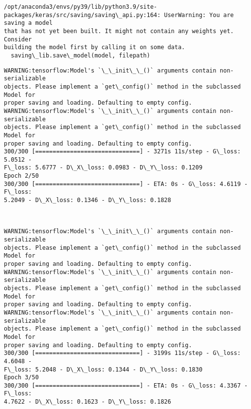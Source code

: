 \documentclass[11pt]{article}
\begin{document}
    \begin{Verbatim}[commandchars=\\\{\}]
/opt/anaconda3/envs/py39/lib/python3.9/site-
packages/keras/src/saving/saving\_api.py:164: UserWarning: You are saving a model
that has not yet been built. It might not contain any weights yet. Consider
building the model first by calling it on some data.
  saving\_lib.save\_model(model, filepath)
    \end{Verbatim}

    \begin{Verbatim}[commandchars=\\\{\}]
WARNING:tensorflow:Model's `\_\_init\_\_()` arguments contain non-serializable
objects. Please implement a `get\_config()` method in the subclassed Model for
proper saving and loading. Defaulting to empty config.
WARNING:tensorflow:Model's `\_\_init\_\_()` arguments contain non-serializable
objects. Please implement a `get\_config()` method in the subclassed Model for
proper saving and loading. Defaulting to empty config.
300/300 [==============================] - 3271s 11s/step - G\_loss: 5.0512 -
F\_loss: 5.6777 - D\_X\_loss: 0.0983 - D\_Y\_loss: 0.1209
Epoch 2/50
300/300 [==============================] - ETA: 0s - G\_loss: 4.6119 - F\_loss:
5.2049 - D\_X\_loss: 0.1346 - D\_Y\_loss: 0.1828
    \end{Verbatim}

    \begin{center}
    \end{center}
    { \hspace*{\fill} \\}
    
    \begin{Verbatim}[commandchars=\\\{\}]
WARNING:tensorflow:Model's `\_\_init\_\_()` arguments contain non-serializable
objects. Please implement a `get\_config()` method in the subclassed Model for
proper saving and loading. Defaulting to empty config.
WARNING:tensorflow:Model's `\_\_init\_\_()` arguments contain non-serializable
objects. Please implement a `get\_config()` method in the subclassed Model for
proper saving and loading. Defaulting to empty config.
WARNING:tensorflow:Model's `\_\_init\_\_()` arguments contain non-serializable
objects. Please implement a `get\_config()` method in the subclassed Model for
proper saving and loading. Defaulting to empty config.
300/300 [==============================] - 3199s 11s/step - G\_loss: 4.6048 -
F\_loss: 5.2048 - D\_X\_loss: 0.1344 - D\_Y\_loss: 0.1830
Epoch 3/50
300/300 [==============================] - ETA: 0s - G\_loss: 4.3367 - F\_loss:
4.7622 - D\_X\_loss: 0.1623 - D\_Y\_loss: 0.1826
    \end{Verbatim}
\end{document}
